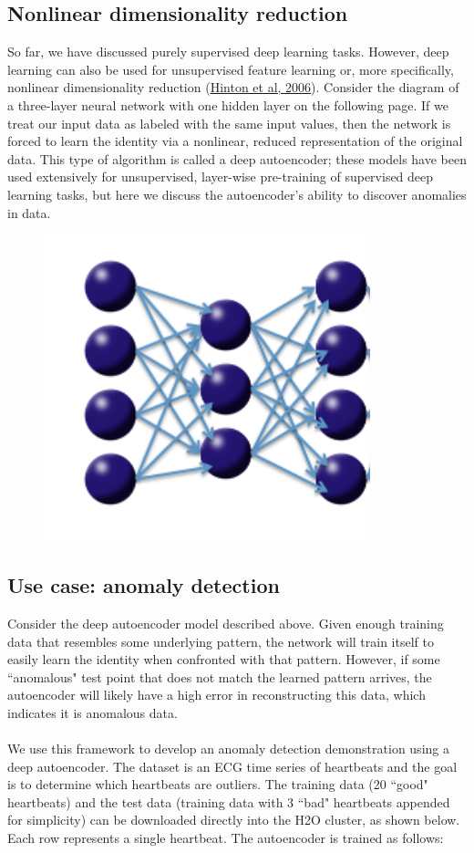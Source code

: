 \subsection{Nonlinear dimensionality reduction} 
So far, we have discussed purely supervised deep learning tasks. However, deep learning can also be used for unsupervised feature learning or, more specifically, nonlinear dimensionality reduction  (\href{http://www.cs.toronto.edu/~hinton/science.pdf}{Hinton et al, 2006}). Consider the diagram of a three-layer neural network with one hidden layer on the following page. If we treat our input data as labeled with the same input values, then the network is forced to learn the identity via a nonlinear, reduced representation of the original data. This type of algorithm is called a deep autoencoder; these models have been used extensively for unsupervised, layer-wise pre-training of supervised deep learning tasks, but here we discuss the autoencoder's ability to discover anomalies in data. 
\\
\begin{figure}[h!]
\centering
\includegraphics[scale=0.7]{autoencoder.png}
\end{figure}
\subsection{Use case: anomaly detection} %
Consider the deep autoencoder model described above. Given enough training data that resembles some underlying pattern, the network will train itself to easily learn the identity when confronted with that pattern. However, if some ``anomalous" test point that does not match the learned pattern arrives, the autoencoder will likely have a high error in reconstructing this data, which indicates it is anomalous data.
\\
\\
We use this framework to develop an anomaly detection demonstration using a deep autoencoder. The dataset is an ECG time series of heartbeats and the goal is to determine which heartbeats are outliers. The training data (20 ``good" heartbeats) and the test data (training data with 3 ``bad" heartbeats appended for simplicity) can be downloaded directly into the H2O cluster, as shown below.  Each row represents a single heartbeat. The autoencoder is trained as follows: 

